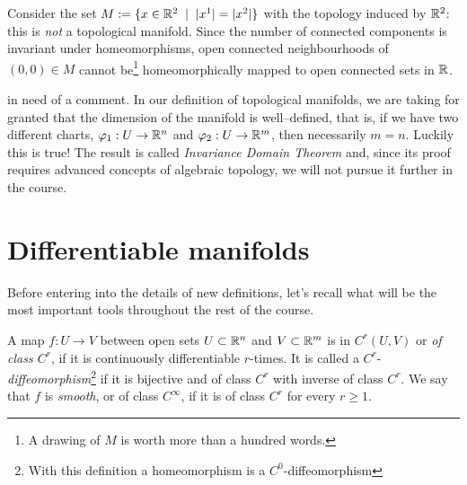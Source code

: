 \begin{example}
	Consider the set $M := \{ x\in\mathbb{R}^2 \;\mid\; |x^1| = |x^2| \}$ with the topology induced by $\mathbb{R}^2$:
   this is \emph{not} a topological manifold.
	Since the number of connected components is invariant under homeomorphisms, open connected neighbourhoods of $(0,0)\in M$ cannot be\footnote{A drawing of $M$ is worth more than a hundred words.} homeomorphically mapped to open connected sets in $\mathbb{R}$.
\end{example}

 in need of a comment.
In our definition of topological manifolds, we are taking for granted that the dimension of the manifold is well--defined, that is, if we have two different charts, $\varphi_1: U \to \mathbb{R}^n$ and $\varphi_2: U \to \mathbb{R}^m$, then necessarily $m=n$. Luckily this is true! The result is called \emph{Invariance Domain Theorem} and, since its proof requires advanced concepts of algebraic topology, we will not pursue it further in the course.

\section{Differentiable manifolds}

Before entering into the details of new definitions, let's recall what will be the most important tools throughout the rest of the course.

\begin{definition}
  A map $f: U \to V$ between open sets $U\subset\mathbb{R}^n$ and $V\subset\mathbb{R}^m$ is in $C^r(U,V)$ or \emph{of class $C^r$}, if it is continuously differentiable $r$-times.
  It is called a $C^r$-\emph{diffeomorphism}\footnote{With this definition a homeomorphism is a $C^0$-diffeomorphism} if it is bijective and of class $C^r$ with inverse of class $C^r$.
  We say that $f$ is \emph{smooth}, or of class $C^\infty$, if it is of class $C^r$ for every $r \geq 1$.
\end{definition}

